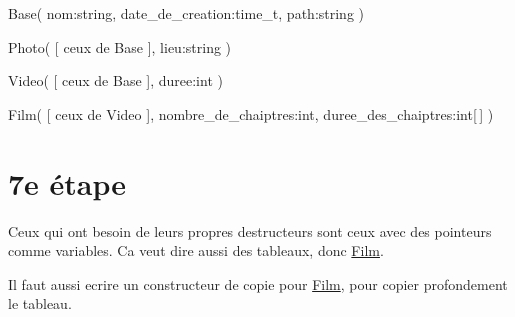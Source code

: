 
\begin{DoxyItemize}
\item Base( nom\-:string, date\-\_\-de\-\_\-creation\-:time\-\_\-t, path\-:string )
\item Photo( \mbox{[} ceux de Base \mbox{]}, lieu\-:string )
\item Video( \mbox{[} ceux de Base \mbox{]}, duree\-:int )
\item Film( \mbox{[} ceux de Video \mbox{]}, nombre\-\_\-de\-\_\-chaiptres\-:int, duree\-\_\-des\-\_\-chaiptres\-:int\mbox{[}$\,$\mbox{]} )
\end{DoxyItemize}

\section*{7e étape}

Ceux qui ont besoin de leurs propres destructeurs sont ceux avec des pointeurs comme variables. Ca veut dire aussi des tableaux, donc \hyperlink{classFilm}{Film}.

Il faut aussi ecrire un constructeur de copie pour \hyperlink{classFilm}{Film}, pour copier profondement le tableau. 